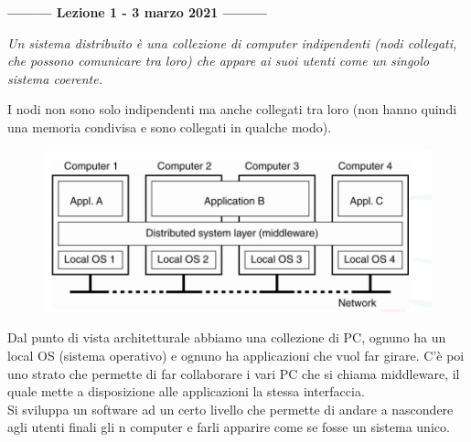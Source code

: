 \begin{center}
    \textbf{--------- Lezione 1 - 3 marzo 2021 ---------}
\end{center}

\textit{Un sistema distribuito è una collezione di computer indipendenti (nodi collegati, che possono comunicare tra loro) che appare ai suoi utenti come un singolo sistema coerente.}

I nodi non sono solo indipendenti ma anche collegati tra loro (non hanno quindi una memoria condivisa e sono collegati in qualche modo). 
\begin{figure}[!ht]
    \centering
    \includegraphics[width = .8\textwidth]{images/lezione1/architettura sd.PNG}
\end{figure}

Dal punto di vista architetturale abbiamo una collezione di PC, ognuno ha un local OS (sistema operativo) e ognuno ha applicazioni che vuol far girare. C'è poi uno strato che permette di far collaborare i vari PC che si chiama middleware, il quale mette a disposizione alle applicazioni la stessa interfaccia.\\

Si sviluppa un software ad un certo livello che permette di andare a nascondere agli utenti finali gli n computer e farli apparire come se fosse un sistema unico. \\

